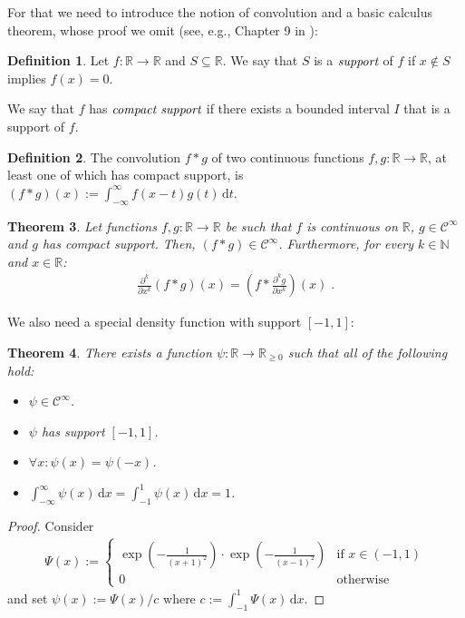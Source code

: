 \documentclass{daj}
\newcommand{\1}{\mathbbm{1}}
\theoremstyle{plain}
\newtheorem{theorem}{Theorem}[section]
\theoremstyle{definition}
\newtheorem{definition}[theorem]{Definition}
\begin{document}
For that we need to introduce the notion of convolution and a basic calculus 
theorem, whose proof we omit (see, e.g., Chapter 9 in \cite{Rud87}):
\begin{definition}
Let $f: \mathbb{R} \to \mathbb{R}$ and $S \subseteq \mathbb{R}$. We say
that $S$ is a $\emph{support}$ of $f$ if $x \notin S$ implies $f(x) = 0$.

We say that $f$ has $\emph{compact support}$ if there exists a bounded
interval $I$ that is a support of $f$.
\end{definition}

\begin{definition}
The convolution $f\ast g$ of two continuous functions 
$f,g: \mathbb{R}\to\mathbb{R}$, at least one of which has
compact support,
is $(f \ast g)(x) := \int_{-\infty}^\infty f(x-t)g(t)\,\mathrm{d}t$.
\end{definition}

\begin{theorem}
\label{thm:convolution-differentiation}
Let functions $f, g: \mathbb{R} \to \mathbb{R}$ be such that $f$ is continuous 
on $\mathbb{R}$, $g \in \mathcal{C}^{\infty}$ and $g$ has compact support. 
Then, $(f \ast g) \in \mathcal{C}^{\infty}$.
Furthermore, for every $k \in \mathbb{N}$ and $x \in \mathbb{R}$:
\begin{align*}
\frac{\partial^k}{\partial x^k}(f \ast g)(x) = 
\left(f \ast \frac{\partial^k g}{\partial x^k} \right)(x) \; .
\end{align*}
\end{theorem}

We also need a special density function with support $[-1, 1]$:

\begin{theorem}
\label{thm:smooth-distribution}
There exists a function $\psi: \mathbb{R} \to \mathbb{R}_{\ge 0}$
such that all of the following hold:
\begin{itemize}
\item $\psi \in \mathcal{C}^{\infty}$.
\item $\psi$ has support $[-1, 1]$.
\item $\forall x: \psi(x) = \psi(-x)$.
\item $\int_{-\infty}^\infty \psi(x) \, \mathrm{d}x = \int_{-1}^1 \psi(x) \, \mathrm{d}x = 1$.
\end{itemize}
\end{theorem}
\begin{proof}
Consider
\begin{align}
\Psi(x) := 
\begin{cases}
\exp(-\frac{1}{(x+1)^2})\cdot \exp(-\frac{1}{(x-1)^2})& 
\text{if $x \in (-1,1)$}\\
0 &\text{otherwise}
\end{cases}
\end{align}
and set $\psi(x) := \Psi(x)/c$ where $c := \int_{-1}^1 \Psi(x) \, \mathrm{d}x$.
\end{proof}
\end{document}
